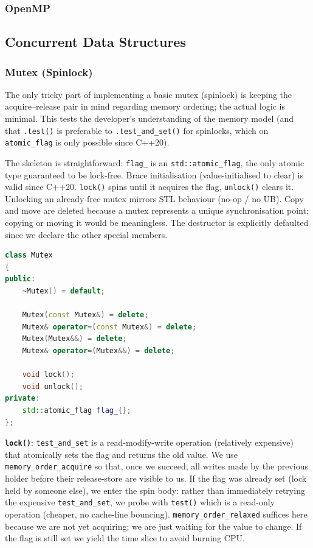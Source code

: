 \documentclass{article}
\begin{document}
\subsubsection{OpenMP}
\subsection{Concurrent Data Structures}
\subsubsection{Mutex (Spinlock)}
The only tricky part of implementing a basic mutex (spinlock) is keeping the acquire--release pair in mind regarding memory ordering; the actual logic is minimal. This tests the developer's understanding of the memory model (and that \texttt{.test()} is preferable to \texttt{.test\_and\_set()} for spinlocks, which on \texttt{atomic\_flag} is only possible since C++20).

The skeleton is straightforward: \texttt{flag\_} is an \texttt{std::atomic\_flag}, the only atomic type guaranteed to be lock-free. Brace initialisation (value-initialised to clear) is valid since C++20. \texttt{lock()} spins until it acquires the flag, \texttt{unlock()} clears it. Unlocking an already-free mutex mirrors STL behaviour (no-op / no UB). Copy and move are deleted because a mutex represents a unique synchronisation point; copying or moving it would be meaningless. The destructor is explicitly defaulted since we declare the other special members.

\begin{lstlisting}[language=cpp,caption={Mutex skeleton}]
class Mutex
{
public:
    ~Mutex() = default;

    Mutex(const Mutex&) = delete;
    Mutex& operator=(const Mutex&) = delete;
    Mutex(Mutex&&) = delete;
    Mutex& operator=(Mutex&&) = delete;

    void lock();
    void unlock();
private:
    std::atomic_flag flag_{};
};
\end{lstlisting}

\textbf{\texttt{lock()}}: \texttt{test\_and\_set} is a read-modify-write operation (relatively expensive) that atomically sets the flag and returns the old value. We use \texttt{memory\_order\_acquire} so that, once we succeed, all writes made by the previous holder before their release-store are visible to us. If the flag was already set (lock held by someone else), we enter the spin body: rather than immediately retrying the expensive \texttt{test\_and\_set}, we probe with \texttt{test()} which is a read-only operation (cheaper, no cache-line bouncing). \texttt{memory\_order\_relaxed} suffices here because we are not yet acquiring; we are just waiting for the value to change. If the flag is still set we yield the time slice to avoid burning CPU.
\end{document}
